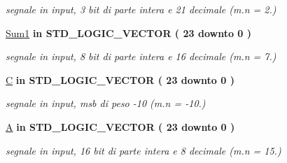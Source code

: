 \begin{DoxyCompactItemize}
\begin{DoxyCompactList}\small\item\em segnale in input, 3 bit di parte intera e 21 decimale (m.\+n = 2.) \end{DoxyCompactList}\item 
\hyperlink{group___linear_regression_ga43a9a0da4f44006af5631ed5ee8ad924}{Sum1}  {\bfseries {\bfseries \textcolor{vhdlchar}{in}\textcolor{vhdlchar}{ }}} {\bfseries \textcolor{vhdlchar}{S\+T\+D\+\_\+\+L\+O\+G\+I\+C\+\_\+\+V\+E\+C\+T\+OR}\textcolor{vhdlchar}{ }\textcolor{vhdlchar}{(}\textcolor{vhdlchar}{ }\textcolor{vhdlchar}{ } \textcolor{vhdldigit}{23} \textcolor{vhdlchar}{ }\textcolor{vhdlchar}{downto}\textcolor{vhdlchar}{ }\textcolor{vhdlchar}{ } \textcolor{vhdldigit}{0} \textcolor{vhdlchar}{ }\textcolor{vhdlchar}{)}\textcolor{vhdlchar}{ }} 
\begin{DoxyCompactList}\small\item\em segnale in input, 8 bit di parte intera e 16 decimale (m.\+n = 7.) \end{DoxyCompactList}\item 
\hyperlink{group___linear_regression_ga17058a6bcb609074c49be51d09202870}{C}  {\bfseries {\bfseries \textcolor{vhdlchar}{in}\textcolor{vhdlchar}{ }}} {\bfseries \textcolor{vhdlchar}{S\+T\+D\+\_\+\+L\+O\+G\+I\+C\+\_\+\+V\+E\+C\+T\+OR}\textcolor{vhdlchar}{ }\textcolor{vhdlchar}{(}\textcolor{vhdlchar}{ }\textcolor{vhdlchar}{ } \textcolor{vhdldigit}{23} \textcolor{vhdlchar}{ }\textcolor{vhdlchar}{downto}\textcolor{vhdlchar}{ }\textcolor{vhdlchar}{ } \textcolor{vhdldigit}{0} \textcolor{vhdlchar}{ }\textcolor{vhdlchar}{)}\textcolor{vhdlchar}{ }} 
\begin{DoxyCompactList}\small\item\em segnale in input, msb di peso -\/10 (m.\+n = -\/10.) \end{DoxyCompactList}\item 
\hyperlink{group___linear_regression_gae1ad6503d157f6c26abdce1131d31ec2}{A}  {\bfseries {\bfseries \textcolor{vhdlchar}{in}\textcolor{vhdlchar}{ }}} {\bfseries \textcolor{vhdlchar}{S\+T\+D\+\_\+\+L\+O\+G\+I\+C\+\_\+\+V\+E\+C\+T\+OR}\textcolor{vhdlchar}{ }\textcolor{vhdlchar}{(}\textcolor{vhdlchar}{ }\textcolor{vhdlchar}{ } \textcolor{vhdldigit}{23} \textcolor{vhdlchar}{ }\textcolor{vhdlchar}{downto}\textcolor{vhdlchar}{ }\textcolor{vhdlchar}{ } \textcolor{vhdldigit}{0} \textcolor{vhdlchar}{ }\textcolor{vhdlchar}{)}\textcolor{vhdlchar}{ }} 
\begin{DoxyCompactList}\small\item\em segnale in input, 16 bit di parte intera e 8 decimale (m.\+n = 15.) \end{DoxyCompactList}\item 

\end{DoxyCompactItemize}
